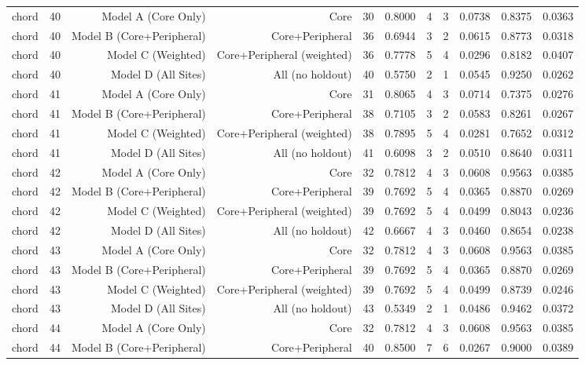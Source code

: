 {\begin{longtable}{lrrrrrrrrrr}
  chord & 40 & Model A (Core Only) & Core & 30 & 0.8000 & 4 & 3 & 0.0738 & 0.8375 & 0.0363 \\
  chord & 40 & Model B (Core+Peripheral) & Core+Peripheral & 36 & 0.6944 & 3 & 2 & 0.0615 & 0.8773 & 0.0318 \\
  chord & 40 & Model C (Weighted) & Core+Peripheral (weighted) & 36 & 0.7778 & 5 & 4 & 0.0296 & 0.8182 & 0.0407 \\
  chord & 40 & Model D (All Sites) & All (no holdout) & 40 & 0.5750 & 2 & 1 & 0.0545 & 0.9250 & 0.0262 \\
  chord & 41 & Model A (Core Only) & Core & 31 & 0.8065 & 4 & 3 & 0.0714 & 0.7375 & 0.0276 \\
  chord & 41 & Model B (Core+Peripheral) & Core+Peripheral & 38 & 0.7105 & 3 & 2 & 0.0583 & 0.8261 & 0.0267 \\
  chord & 41 & Model C (Weighted) & Core+Peripheral (weighted) & 38 & 0.7895 & 5 & 4 & 0.0281 & 0.7652 & 0.0312 \\
  chord & 41 & Model D (All Sites) & All (no holdout) & 41 & 0.6098 & 3 & 2 & 0.0510 & 0.8640 & 0.0311 \\
  chord & 42 & Model A (Core Only) & Core & 32 & 0.7812 & 4 & 3 & 0.0608 & 0.9563 & 0.0385 \\
  chord & 42 & Model B (Core+Peripheral) & Core+Peripheral & 39 & 0.7692 & 5 & 4 & 0.0365 & 0.8870 & 0.0269 \\
  chord & 42 & Model C (Weighted) & Core+Peripheral (weighted) & 39 & 0.7692 & 5 & 4 & 0.0499 & 0.8043 & 0.0236 \\
  chord & 42 & Model D (All Sites) & All (no holdout) & 42 & 0.6667 & 4 & 3 & 0.0460 & 0.8654 & 0.0238 \\
  chord & 43 & Model A (Core Only) & Core & 32 & 0.7812 & 4 & 3 & 0.0608 & 0.9563 & 0.0385 \\
  chord & 43 & Model B (Core+Peripheral) & Core+Peripheral & 39 & 0.7692 & 5 & 4 & 0.0365 & 0.8870 & 0.0269 \\
  chord & 43 & Model C (Weighted) & Core+Peripheral (weighted) & 39 & 0.7692 & 5 & 4 & 0.0499 & 0.8739 & 0.0246 \\
  chord & 43 & Model D (All Sites) & All (no holdout) & 43 & 0.5349 & 2 & 1 & 0.0486 & 0.9462 & 0.0372 \\
  chord & 44 & Model A (Core Only) & Core & 32 & 0.7812 & 4 & 3 & 0.0608 & 0.9563 & 0.0385 \\
  chord & 44 & Model B (Core+Peripheral) & Core+Peripheral & 40 & 0.8500 & 7 & 6 & 0.0267 & 0.9000 & 0.0389 \\

\end{longtable}}
